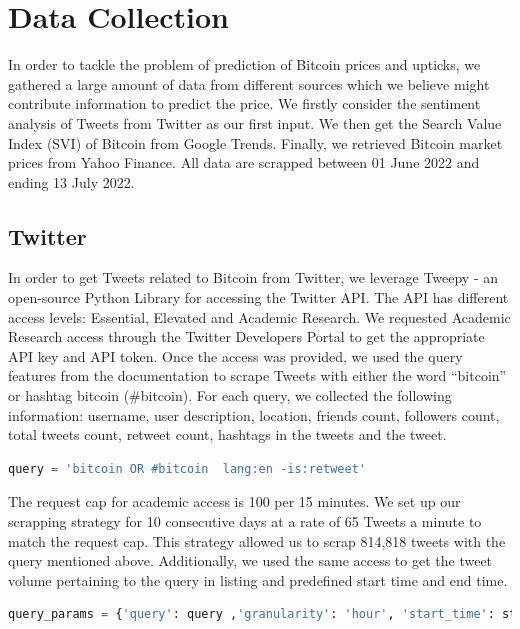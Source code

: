 \section{Data Collection}
In order to tackle the problem of prediction of Bitcoin prices and upticks, we gathered a large amount of data from different sources which we believe might contribute information to predict the price. We firstly consider the sentiment analysis of Tweets from Twitter as our first input. We then get the Search Value Index (SVI) of Bitcoin from Google Trends. Finally, we retrieved Bitcoin market prices from Yahoo Finance. All data are scrapped between 01 June 2022 and ending 13 July 2022.
\subsection*{Twitter}
In order to get Tweets related to Bitcoin from Twitter, we leverage Tweepy - an open-source Python Library for accessing the Twitter API. The API has different access levels: Essential, Elevated and Academic Research. We requested Academic Research access through the Twitter Developers Portal to get the appropriate API key and API token. Once the access was provided, we used the query features from the documentation to scrape Tweets with either the word “bitcoin” or hashtag bitcoin (\#bitcoin). For each query, we collected the following information: username, user description, location, friends count, followers count, total tweets count, retweet count, hashtags in the tweets and the tweet.
\begin{lstlisting}[language=Python, caption= {Tweepy query for bitcoin, \#bitcoin and excluding re\-tweets}, label = tweet_search]
    query = 'bitcoin OR #bitcoin  lang:en -is:retweet'
\end{lstlisting}
The request cap for academic access is 100 per 15 minutes. We set up our scrapping strategy for 10 consecutive days at a rate of 65 Tweets a minute to match the request cap. This strategy allowed us to scrap 814,818 tweets with the query mentioned above. Additionally, we used the same access to get the tweet volume pertaining to the query in listing  and predefined start time and end time.

\begin{lstlisting}[language=Python, caption= {Tweepy query to get tweet count withing each hour between predefined start time and end time}, label= tweet_count]
    query_params = {'query': query ,'granularity': 'hour', 'start_time': start_time, 'end_time': end_time}
\end{lstlisting}
